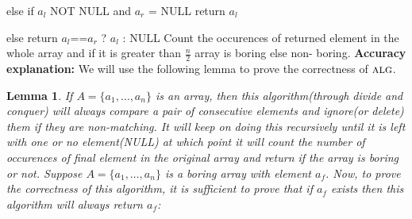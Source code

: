 \documentclass[11pt]{article}
\newcommand{\alg}{\textsc{alg}}
\newtheorem{lemma}[theorem]{Lemma}
\begin{document}
else if $a_l$ NOT  NULL and $a_r$ = NULL return $a_l$

else return $a_l$==$a_r$ ? $a_l$ : NULL\newline
Count the occurences of returned element in the whole array and if it is greater than $\frac{n}{2}$ array is boring else non-
boring.\newline
{\bf Accuracy explanation:}\newline
We will use the following lemma to prove the correctness of $\alg$.

\begin{lemma}\label{boring-array-lemma}
If $A = \{a_1, \dots, a_n\}$ is an array, then this algorithm(through divide and conquer) will always compare a pair of consecutive elements
and ignore(or delete) them if they are non-matching. It will keep on doing this recursively until it is left with one or no element(NULL) at
which point it will count the number of occurences of final element in the original array and return if the array is boring or not.
Suppose $A = \{a_1, \dots, a_n\}$ is a boring array with element $a_f$. Now, to prove the correctness of this algorithm, it is sufficient to
prove that if $a_f$ exists then this algorithm will always return $a_f$:
\end{lemma}
\end{document}
